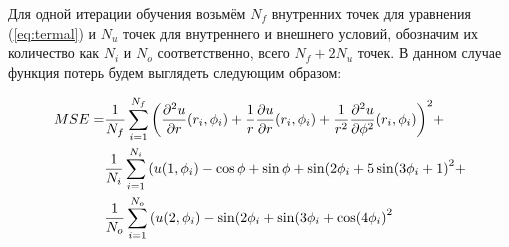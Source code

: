 \documentclass[a4paper,14pt]{extarticle} %
\begin{document}



Для одной итерации обучения возьмём $N_f$ внутренних точек для уравнения (\ref{eq:termal}) и $N_u$ точек для внутреннего и внешнего условий, обозначим их количество как $N_i$ и $N_o$ соответственно, всего $N_f+2N_u$ точек. В данном случае функция потерь будем выглядеть следующим образом:

\begin{equation}\label{eq:termal_cond}
    \begin{split}
        MSE =& \frac{1}{N_f}\sum_{i=1}^{N_f} {\left(  \frac{\partial^2 u}{\partial r}(r_i, \phi_i) + \frac{1}{r} \frac{\partial u}{\partial r}(r_i, \phi_i) + \frac{1}{r^2}\frac{\partial^2 u}{\partial \phi^2}(r_i, \phi_i) \right)}^2 + \\
        & \frac{1}{N_i}\sum_{i=1}^{N_i} {\left( u(1, \phi_i) - \cos\phi+\sin\phi+\sin(2\phi_i+5\sin(3\phi_i+1 \right)}^2 + \\
        & \frac{1}{N_o}\sum_{i=1}^{N_o} {\left( u(2, \phi_i) - \sin(2\phi_i+\sin(3\phi_i+\cos(4\phi_i \right)}^2
    \end{split}
\end{equation}
\end{document}
